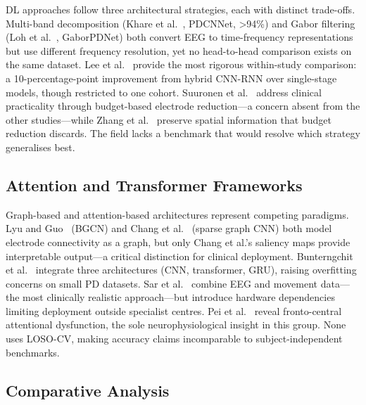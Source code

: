 DL approaches follow three architectural strategies, each with distinct trade-offs. Multi-band decomposition (Khare et al.~\cite{khare2021pdcnnet}, PDCNNet, >94\%) and Gabor filtering (Loh et al.~\cite{loh2021gaborpd}, GaborPDNet) both convert EEG to time-frequency representations but use different frequency resolution, yet no head-to-head comparison exists on the same dataset. Lee et al.~\cite{lee2021pd} provide the most rigorous within-study comparison: a 10-percentage-point improvement from hybrid CNN-RNN over single-stage models, though restricted to one cohort. Suuronen et al.~\cite{suuronen2023budget} address clinical practicality through budget-based electrode reduction---a concern absent from the other studies---while Zhang et al.~\cite{zhang2024channel} preserve spatial information that budget reduction discards. The field lacks a benchmark that would resolve which strategy generalises best.

\subsection{Attention and Transformer Frameworks}

Graph-based and attention-based architectures represent competing paradigms. Lyu and Guo~\cite{lyu2023bgcn} (BGCN) and Chang et al.~\cite{chang2023asgcnn} (sparse graph CNN) both model electrode connectivity as a graph, but only Chang et al.'s saliency maps provide interpretable output---a critical distinction for clinical deployment. Bunterngchit et al.~\cite{bunterngchit2025ctesm} integrate three architectures (CNN, transformer, GRU), raising overfitting concerns on small PD datasets. Sar et al.~\cite{sar2025multimodal} combine EEG and movement data---the most clinically realistic approach---but introduce hardware dependencies limiting deployment outside specialist centres. Pei et al.~\cite{pei2025spatiotemporal} reveal fronto-central attentional dysfunction, the sole neurophysiological insight in this group. None uses LOSO-CV, making accuracy claims incomparable to subject-independent benchmarks.

\subsection{Comparative Analysis}

